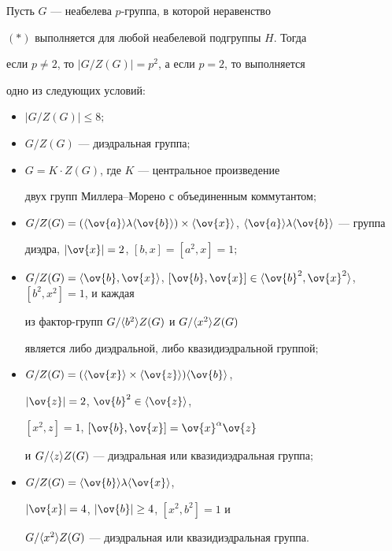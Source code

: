 \begin{thm}


Пусть $G$ --- неабелева $p$-группа, в которой неравенство


$(\ast)$ выполняется для любой неабелевой подгруппы $H$. Тогда


если $p\ne 2$, то $|G/Z(G)|=p^2$, а если $p=2$, то выполняется


одно из следующих условий\/${:}$


\begin{itemize}


\item[1)] $|G/Z(G)|\le 8;$


\item[2)] $G/Z(G)$ --- диэдральная группа\/$;$


\item[3)] $G=K\cdot Z(G)$, где $K$ --- центральное произведение 


двух групп Миллера--Морено с объединенным коммутантом\/$;$


\item[4)] $G/Z(G)=(\ls\ov{a}\ps\lambda\ls\ov{b}\ps)\times\ls


\ov{x}\ps$, $\ls\ov{a}\ps\lambda\ls\ov{b}\ps$ --- группа


диэдра, $|\ov{x}|=2$, $[b,x]=[a^2,x]=1;$


\item[5)] $G/Z(G)=\ls\ov{b},\ov{x}\ps$, $[\ov{b},


\ov{x}]\in\ls\ov{b}^2,\ov{x}^2\ps$, $[b^2,x^2]=1$, и каждая


из фактор-групп $G/\langle b^2\rangle Z(G)$ и $G/\langle x^2\rangle Z(G)$


является либо диэдральной, либо квазидиэдральной группой\/$;$


\item[6)] $G/Z(G)=(\ls\ov{x}\ps\times\ls\ov{z}\ps)


\ls\ov{b}\ps$,


$|\ov{z}|=2$, $\ov{b}^2\in\ls\ov{z}\ps$,


$[x^2,z]=1$, $[\ov{b},\ov{x}]=\ov{x}^{\alpha}\ov{z}$


и $G/\langle z\rangle Z(G)$ --- диэдральная или квазидиэдральная группа\/$;$


\item[7)] $G/Z(G)=\ls\ov{b}\ps\lambda\ls\ov{x}\ps$,


$|\ov{x}|=4$, $|\ov{b}|\ge 4$, $[x^2,b^2]=1$ и


$G/\langle x^2\rangle Z(G)$ --- диэдральная или квазидиэдральная группа.


\end{itemize}


\end{thm}






